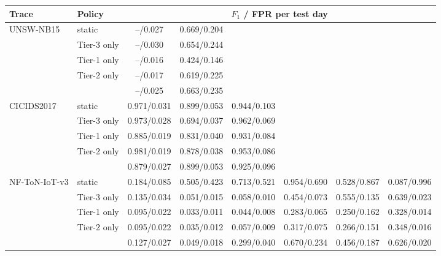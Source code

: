 \begin{tabular}{@{}llcccccc@{}}
\toprule
Trace & Policy & \multicolumn{6}{c}{$F_1$ / FPR per test day} \\
\midrule
UNSW-NB15 & static & --/0.027 & 0.669/0.204 &  &  &  &  \\
 & Tier-3 only & --/0.030 & 0.654/0.244 &  &  &  &  \\
 & Tier-1 only & --/0.016 & 0.424/0.146 &  &  &  &  \\
 & Tier-2 only & --/0.017 & 0.619/0.225 &  &  &  &  \\
 & \drift{} & --/0.025 & 0.663/0.235 &  &  &  &  \\
\midrule
CICIDS2017 & static & 0.971/0.031 & 0.899/0.053 & 0.944/0.103 &  &  &  \\
 & Tier-3 only & 0.973/0.028 & 0.694/0.037 & 0.962/0.069 &  &  &  \\
 & Tier-1 only & 0.885/0.019 & 0.831/0.040 & 0.931/0.084 &  &  &  \\
 & Tier-2 only & 0.981/0.019 & 0.878/0.038 & 0.953/0.086 &  &  &  \\
 & \drift{} & 0.879/0.027 & 0.899/0.053 & 0.925/0.096 &  &  &  \\
\midrule
NF-ToN-IoT-v3 & static & 0.184/0.085 & 0.505/0.423 & 0.713/0.521 & 0.954/0.690 & 0.528/0.867 & 0.087/0.996 \\
 & Tier-3 only & 0.135/0.034 & 0.051/0.015 & 0.058/0.010 & 0.454/0.073 & 0.555/0.135 & 0.639/0.023 \\
 & Tier-1 only & 0.095/0.022 & 0.033/0.011 & 0.044/0.008 & 0.283/0.065 & 0.250/0.162 & 0.328/0.014 \\
 & Tier-2 only & 0.095/0.022 & 0.035/0.012 & 0.057/0.009 & 0.317/0.075 & 0.266/0.151 & 0.348/0.016 \\
 & \drift{} & 0.127/0.027 & 0.049/0.018 & 0.299/0.040 & 0.670/0.234 & 0.456/0.187 & 0.626/0.020 \\
\bottomrule
\end{tabular}